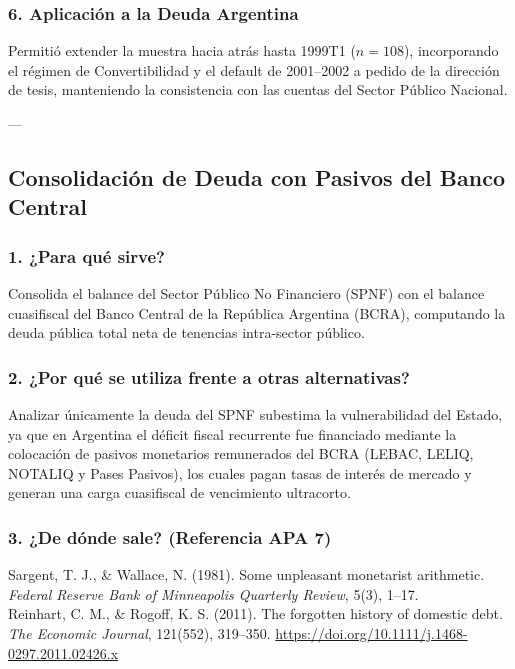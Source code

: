 \documentclass[11pt,a4paper]{article}
\begin{document}
\subsubsection{6. Aplicación a la Deuda Argentina}
Permitió extender la muestra hacia atrás hasta 1999T1 ($n=108$), incorporando el régimen de Convertibilidad y el default de 2001--2002 a pedido de la dirección de tesis, manteniendo la consistencia con las cuentas del Sector Público Nacional.

---

\subsection{Consolidación de Deuda con Pasivos del Banco Central}

\subsubsection{1. ¿Para qué sirve?}
Consolida el balance del Sector Público No Financiero (SPNF) con el balance cuasifiscal del Banco Central de la República Argentina (BCRA), computando la deuda pública total neta de tenencias intra-sector público.

\subsubsection{2. ¿Por qué se utiliza frente a otras alternativas?}
Analizar únicamente la deuda del SPNF subestima la vulnerabilidad del Estado, ya que en Argentina el déficit fiscal recurrente fue financiado mediante la colocación de pasivos monetarios remunerados del BCRA (LEBAC, LELIQ, NOTALIQ y Pases Pasivos), los cuales pagan tasas de interés de mercado y generan una carga cuasifiscal de vencimiento ultracorto.

\subsubsection{3. ¿De dónde sale? (Referencia APA 7)}
\begin{mdframed}[style=apabox]
Sargent, T. J., \& Wallace, N. (1981). Some unpleasant monetarist arithmetic. \textit{Federal Reserve Bank of Minneapolis Quarterly Review}, 5(3), 1--17.\\
Reinhart, C. M., \& Rogoff, K. S. (2011). The forgotten history of domestic debt. \textit{The Economic Journal}, 121(552), 319--350. \url{https://doi.org/10.1111/j.1468-0297.2011.02426.x}
\end{mdframed}
\end{document}
